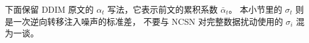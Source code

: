 下面保留 DDIM 原文的 $\alpha_t$ 写法，它表示前文的累积系数 $\bar\alpha_t$。
本小节里的 $\sigma_t$ 则是一次逆向转移注入噪声的标准差，
不要与 NCSN 对完整数据扰动使用的 $\sigma_i$ 混为一谈。

